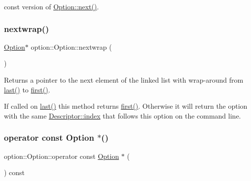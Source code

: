 const version of \hyperlink{classoption_1_1_option_a59ae9aed505f4d410633bb36478a32be}{Option\+::next()}. \mbox{\label{classoption_1_1_option_ae8d8c058af3c781cb1d444998df48fef}} 
\subsubsection{\texorpdfstring{nextwrap()}{nextwrap()}}
{\footnotesize\ttfamily \hyperlink{classoption_1_1_option}{Option}$\ast$ option\+::\+Option\+::nextwrap (\begin{DoxyParamCaption}{ }\end{DoxyParamCaption})\hspace{0.3cm}{\ttfamily [inline]}}



Returns a pointer to the next element of the linked list with wrap-\/around from \hyperlink{classoption_1_1_option_afe2aff68191e55b59c53fac3dbbcd7c3}{last()} to \hyperlink{classoption_1_1_option_abb4e13cd7c90999c8a6b1f871cece283}{first()}. 

If called on \hyperlink{classoption_1_1_option_afe2aff68191e55b59c53fac3dbbcd7c3}{last()} this method returns \hyperlink{classoption_1_1_option_abb4e13cd7c90999c8a6b1f871cece283}{first()}. Otherwise it will return the option with the same \hyperlink{structoption_1_1_descriptor_a1fee8ac44f529c99ac2b1149b4c391b1}{Descriptor\+::index} that follows this option on the command line. \mbox{\label{classoption_1_1_option_a3c0504baaa809c622d59c2c09f83e25b}} 
\subsubsection{\texorpdfstring{operator const Option $\ast$()}{operator const Option *()}}
{\footnotesize\ttfamily option\+::\+Option\+::operator const \hyperlink{classoption_1_1_option}{Option} $\ast$ (\begin{DoxyParamCaption}{ }\end{DoxyParamCaption}) const\hspace{0.3cm}{\ttfamily [inline]}}



